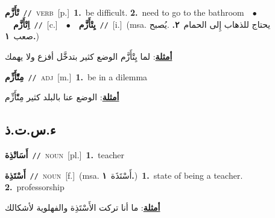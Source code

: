 \documentclass[10pt,a4paper,twoside]{article} %
\begin{document}
\begin{multicols}{2}
{\setlength\topsep{0pt}\textbf{\foreignlanguage{arabic}{تْأَزَّم}}\ {\color{gray}\texttt{//}\color{black}}\ \textsc{verb}\ [p.]\ \textbf{1.}~be difficult.  \textbf{2.}~need to go to the bathroom\ \ $\bullet$\ \ \setlength\topsep{0pt}\textbf{\foreignlanguage{arabic}{اِتْأَزَّم}}\ {\color{gray}\texttt{//}\color{black}}\ [c.]\ \ $\bullet$\ \ \setlength\topsep{0pt}\textbf{\foreignlanguage{arabic}{يِتْأَزَّم}}\ {\color{gray}\texttt{//}\color{black}}\ [i.]\ \color{gray}(msa. \foreignlanguage{arabic}{يحتاج للذهاب إِلى الحمام}~\foreignlanguage{arabic}{\textbf{٢.}}  .\foreignlanguage{arabic}{يُصبح صعب}~\foreignlanguage{arabic}{\textbf{١.}})\color{black}\  \begin{flushright}\color{gray}\foreignlanguage{arabic}{\textbf{\underline{\foreignlanguage{arabic}{أمثلة}}}: لما يِتْأَزَّم الوضع كثير بتدخَّل أفزع ولا يهمك}\end{flushright}\color{black}} \vspace{2mm}

{\setlength\topsep{0pt}\textbf{\foreignlanguage{arabic}{مِتّْأَزِّم}}\ {\color{gray}\texttt{//}\color{black}}\ \textsc{adj}\ [m.]\ \textbf{1.}~be in a dilemma\  \begin{flushright}\color{gray}\foreignlanguage{arabic}{\textbf{\underline{\foreignlanguage{arabic}{أمثلة}}}: الوضع عنا بالبلد كثير مِتّْأَزِّم}\end{flushright}\color{black}} \vspace{2mm}

\vspace{-3mm}
\subsection*{\color{blue}\foreignlanguage{arabic}{ء.س.ت.ذ}\color{blue}{}} 

{\setlength\topsep{0pt}\textbf{\foreignlanguage{arabic}{أَسَاتْذِة}}\ {\color{gray}\texttt{//}\color{black}}\ \textsc{noun}\ [pl.]\ \textbf{1.}~teacher\ } \vspace{2mm}

{\setlength\topsep{0pt}\textbf{\foreignlanguage{arabic}{أَسْتَذِة}}\ {\color{gray}\texttt{//}\color{black}}\ \textsc{noun}\ [f.]\ \color{gray}(msa. \foreignlanguage{arabic}{أَسْتَذَة}~\foreignlanguage{arabic}{\textbf{١.}})\color{black}\ \textbf{1.}~state of being a teacher.  \textbf{2.}~professorship\  \begin{flushright}\color{gray}\foreignlanguage{arabic}{\textbf{\underline{\foreignlanguage{arabic}{أمثلة}}}: ما أنا تركت الأَسْتَذِة والفهلوية لأشكالك}\end{flushright}\color{black}} \vspace{2mm}


\end{multicols}
\end{document}
